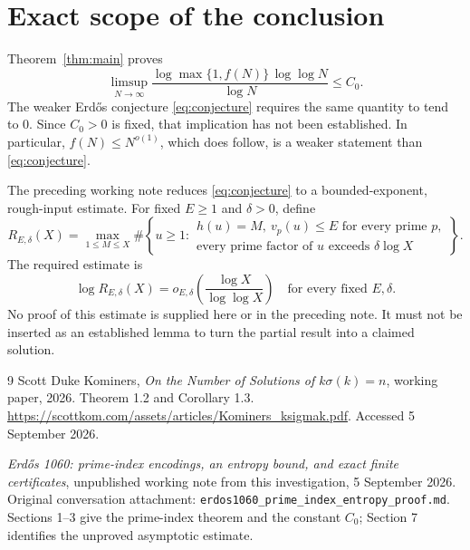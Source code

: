\documentclass[11pt,a4paper]{article}
\theoremstyle{remark}
\begin{document}
\section{Exact scope of the conclusion}
Theorem~\ref{thm:main} proves
\[
\limsup_{N\to\infty}
\frac{\log\max\{1,f(N)\}\,\log\log N}{\log N}\le C_0.
\]
The weaker Erd\H{o}s conjecture \eqref{eq:conjecture} requires the same quantity to tend to $0$. Since $C_0>0$ is fixed, that implication has not been established. In particular, $f(N)\le N^{o(1)}$, which does follow, is a weaker statement than \eqref{eq:conjecture}.

The preceding working note reduces \eqref{eq:conjecture} to a bounded-exponent, rough-input estimate. For fixed $E\ge1$ and $\delta>0$, define
\[
R_{E,\delta}(X)=\max_{1\le M\le X}
\#\left\{u\ge1:\begin{array}{l}
h(u)=M,\ v_p(u)\le E\text{ for every prime }p,\\
\text{every prime factor of }u\text{ exceeds }\delta\log X
\end{array}\right\}.
\]
The required estimate is
\[
\log R_{E,\delta}(X)=o_{E,\delta}\!\left(\frac{\log X}{\log\log X}\right)
\quad\text{for every fixed }E,\delta.
\]
No proof of this estimate is supplied here or in the preceding note. It must not be inserted as an established lemma to turn the partial result into a claimed solution.

\begin{thebibliography}{9}
Scott Duke Kominers,
\emph{On the Number of Solutions of $k\sigma(k)=n$}, working paper, 2026.
Theorem 1.2 and Corollary 1.3.
\url{https://scottkom.com/assets/articles/Kominers_ksigmak.pdf}.
Accessed 5 September 2026.

\emph{Erd\H{o}s 1060: prime-index encodings, an entropy bound, and exact finite certificates},
unpublished working note from this investigation, 5 September 2026.
Original conversation attachment: \texttt{erdos1060\_prime\_index\_entropy\_proof.md}.
Sections 1--3 give the prime-index theorem and the constant $C_0$; Section 7 identifies the unproved asymptotic estimate.
\end{thebibliography}
\end{document}
